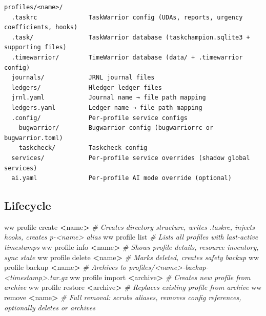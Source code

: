 \documentclass[
]{article}
\newenvironment{Shaded}{\begin{snugshade}}{\end{snugshade}}
\newcommand{\CommentTok}[1]{\textcolor[rgb]{0.56,0.35,0.01}{\textit{#1}}}
\newcommand{\ExtensionTok}[1]{#1}
\newcommand{\NormalTok}[1]{#1}
\newcommand{\OperatorTok}[1]{\textcolor[rgb]{0.81,0.36,0.00}{\textbf{#1}}}
\begin{document}
\begin{verbatim}
profiles/<name>/
  .taskrc              TaskWarrior config (UDAs, reports, urgency coefficients, hooks)
  .task/               TaskWarrior database (taskchampion.sqlite3 + supporting files)
  .timewarrior/        TimeWarrior database (data/ + .timewarrior config)
  journals/            JRNL journal files
  ledgers/             Hledger ledger files
  jrnl.yaml            Journal name → file path mapping
  ledgers.yaml         Ledger name → file path mapping
  .config/             Per-profile service configs
    bugwarrior/        Bugwarrior config (bugwarriorrc or bugwarrior.toml)
    taskcheck/         Taskcheck config
  services/            Per-profile service overrides (shadow global services)
  ai.yaml              Per-profile AI mode override (optional)
\end{verbatim}

\subsection{Lifecycle}\label{lifecycle}

\begin{Shaded}
\begin{Highlighting}[]
\ExtensionTok{ww}\NormalTok{ profile create }\OperatorTok{\textless{}}\NormalTok{name}\OperatorTok{\textgreater{}}       \CommentTok{\# Creates directory structure, writes .taskrc, injects hooks, creates p{-}\textless{}name\textgreater{} alias}
\ExtensionTok{ww}\NormalTok{ profile list                }\CommentTok{\# Lists all profiles with last{-}active timestamps}
\ExtensionTok{ww}\NormalTok{ profile info }\OperatorTok{\textless{}}\NormalTok{name}\OperatorTok{\textgreater{}}         \CommentTok{\# Shows profile details, resource inventory, sync state}
\ExtensionTok{ww}\NormalTok{ profile delete }\OperatorTok{\textless{}}\NormalTok{name}\OperatorTok{\textgreater{}}       \CommentTok{\# Marks deleted, creates safety backup}
\ExtensionTok{ww}\NormalTok{ profile backup }\OperatorTok{\textless{}}\NormalTok{name}\OperatorTok{\textgreater{}}       \CommentTok{\# Archives to profiles/\textless{}name\textgreater{}{-}backup{-}\textless{}timestamp\textgreater{}.tar.gz}
\ExtensionTok{ww}\NormalTok{ profile import }\OperatorTok{\textless{}}\NormalTok{archive}\OperatorTok{\textgreater{}}    \CommentTok{\# Creates new profile from archive}
\ExtensionTok{ww}\NormalTok{ profile restore }\OperatorTok{\textless{}}\NormalTok{archive}\OperatorTok{\textgreater{}}   \CommentTok{\# Replaces existing profile from archive}
\ExtensionTok{ww}\NormalTok{ remove }\OperatorTok{\textless{}}\NormalTok{name}\OperatorTok{\textgreater{}}               \CommentTok{\# Full removal: scrubs aliases, removes config references, optionally deletes or archives}
\end{Highlighting}
\end{Shaded}
\end{document}

